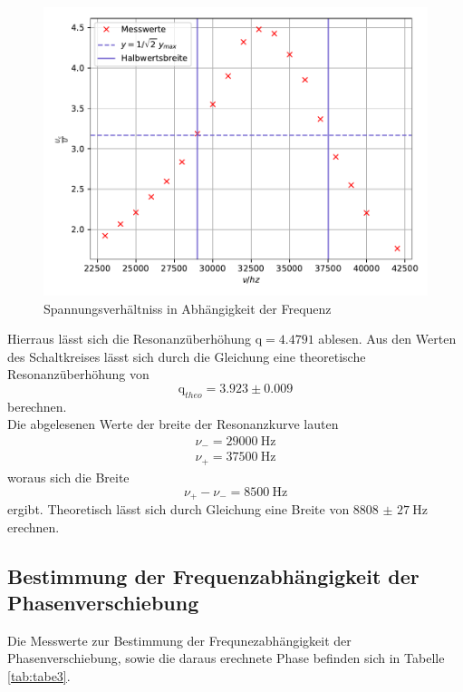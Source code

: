 \begin{figure}[H]
  \centering
  \includegraphics{plot3.pdf}
  \caption{Spannungsverhältniss in Abhängigkeit der Frequenz}
  \label{fig:plot3}
\end{figure}

\noindent Hierraus lässt sich die Resonanzüberhöhung $\text{q} = 4.4791 $ ablesen. Aus den Werten des
Schaltkreises lässt sich durch die Gleichung %
eine theoretische Resonanzüberhöhung von
\begin{equation*}
  \text{q}_{theo} = 3.923 \pm 0.009
\end{equation*}
\noindent berechnen. \\
\noindent Die abgelesenen Werte der breite der Resonanzkurve lauten
\begin{align*}
  \nu_- =\SI{29000}{\hertz} \\ %
  \nu_+ =\SI{37500}{\hertz} %
\end{align*}
woraus sich die Breite
\begin{equation*}
  \nu_+ - \nu_- = \SI{8500}{\hertz}
\end{equation*}
ergibt. Theoretisch lässt sich durch Gleichung %
eine Breite von $\SI{8808(27)}{\hertz} $ erechnen.
\subsection{Bestimmung der Frequenzabhängigkeit der Phasenverschiebung}

Die Messwerte zur Bestimmung der Frequnezabhängigkeit der Phasenverschiebung,
sowie die daraus erechnete Phase befinden sich in Tabelle \ref{tab:tabe3}.


